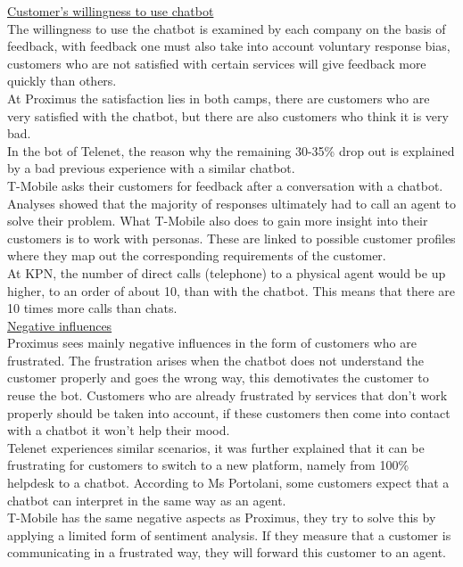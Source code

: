\break
\ul{Customer's willingness to use chatbot}\\
The willingness to use the chatbot is examined by each company on the basis of feedback, with feedback one must also take into account voluntary response bias, customers who are not satisfied with certain services will give feedback more quickly than others.\\
\break
At Proximus the satisfaction lies in both camps, there are customers who are very satisfied with the chatbot, but there are also customers who think it is very bad.\\ 
\break
In the bot of Telenet, the reason why the remaining 30-35\% drop out is explained by a bad previous experience with a similar chatbot.\\ 
\break
T-Mobile asks their customers for feedback after a conversation with a chatbot. Analyses showed that the majority of responses ultimately had to call an agent to solve their problem. What T-Mobile also does to gain more insight into their customers is to work with personas. These are linked to possible customer profiles where they map out the corresponding requirements of the customer.\\ 
\break
At KPN, the number of direct calls (telephone) to a physical agent would be up higher, to an order of about 10, than with the chatbot. This means that there are 10 times more calls than chats.\\
\break
\ul{Negative influences}\\
Proximus sees mainly negative influences in the form of customers who are frustrated. The frustration arises when the chatbot does not understand the customer properly and goes the wrong way, this demotivates the customer to reuse the bot. Customers who are already frustrated by services that don't work properly should be taken into account, if these customers then come into contact with a chatbot it won't help their mood.\\
\break
Telenet experiences similar scenarios, it was further explained that it can be frustrating for customers to switch to a new platform, namely from 100\% helpdesk to a chatbot. According to Ms Portolani, some customers expect that a chatbot can interpret in the same way as an agent.\\
\break
T-Mobile has the same negative aspects as Proximus, they try to solve this by applying a limited form of sentiment analysis. If they measure that a customer is communicating in a frustrated way, they will forward this customer to an agent.\\
